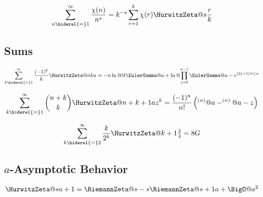 \documentclass{article}
\begin{document}
\begin{equation}\label{eq:ZE.HZE.ES3}
  \sum_{n \hiderel{=} 1}^\infty \frac{\chi(n)}{n^s}
  = k^{-s} \sum_{r=1}^k \chi(r) \HurwitzZeta@{s}{\frac{r}{k}}
\end{equation}

\subsection{Sums}\label{sec:ZE.HZE.SIF}


\begin{equation}\label{eq:ZE.HZE.SIF1}
  \sum_{k \hiderel{=} 1}^\infty \frac{\opminus^k}{k} \HurwitzZeta@{nk}{a}
  = -n \ln@@{\EulerGamma@{a}}
  + \ln@{\prod_{j=0}^{n-1} \EulerGamma@{a-\expe^{(2j+1)\cpi \iunit/n}}}
\end{equation}

\begin{equation}\label{eq:ZE.HZE.SIF2}
  \sum_{k \hiderel{=} 1}^\infty \binom{n+k}{k} \HurwitzZeta@{n+k+1}{a} z^k
  = \frac{\opminus^n}{n!}
    \left( \digamma^{(n)}@{a} - \digamma^{(n)}@{a-z} \right)
\end{equation}

\begin{equation}\label{eq:ZE.HZE.SIF3}
  \sum_{k \hiderel{=} 2}^\infty \frac{k}{2^k}
     \HurwitzZeta@{k+1}{\tfrac{3}{4}}
  = 8\CatalansConstant
\end{equation}


\subsection{$a$-Asymptotic Behavior}\label{sec:ZE.HZE.ASY}


\begin{equation}\label{eq:ZE.HZE.ASY1}
  \HurwitzZeta@{s}{a+1}
  = \RiemannZeta@{s} - s \RiemannZeta@{s+1} a + \BigO@{a^2}
\end{equation}
\end{document}
